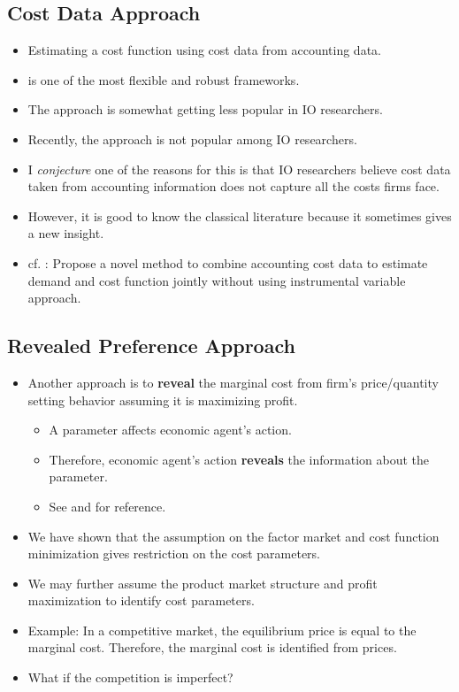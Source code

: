 \documentclass[]{book}
\providecommand{\tightlist}{%
  \setlength{\itemsep}{0pt}\setlength{\parskip}{0pt}}
\theoremstyle{definition}
\theoremstyle{definition}
\theoremstyle{definition}
\theoremstyle{remark}
\begin{document}
\subsection{Cost Data Approach}\label{cost-data-approach}

\begin{itemize}
\tightlist
\item
  Estimating a cost function using cost data from accounting data.
\item
  \citet{McElroy1987} is one of the most flexible and robust frameworks.
\item
  The approach is somewhat getting less popular in IO researchers.
\item
  Recently, the approach is not popular among IO researchers.
\item
  I \textit{conjecture} one of the reasons for this is that IO
  researchers believe cost data taken from accounting information does
  not capture all the costs firms face.
\item
  However, it is good to know the classical literature because it
  sometimes gives a new insight.
\item
  cf. \citet{Byrne2015} : Propose a novel method to combine accounting
  cost data to estimate demand and cost function jointly without using
  instrumental variable approach.
\end{itemize}

\subsection{Revealed Preference
Approach}\label{revealed-preference-approach}

\begin{itemize}
\tightlist
\item
  Another approach is to \textbf{reveal} the marginal cost from firm's
  price/quantity setting behavior assuming it is maximizing profit.

  \begin{itemize}
  \tightlist
  \item
    A parameter affects economic agent's action.
  \item
    Therefore, economic agent's action \textbf{reveals} the information
    about the parameter.
  \item
    See \citet{Bresnahan1981} and \citet{Bresnahan1989} for reference.
  \end{itemize}
\item
  We have shown that the assumption on the factor market and cost
  function minimization gives restriction on the cost parameters.
\item
  We may further assume the product market structure and profit
  maximization to identify cost parameters.
\item
  Example: In a competitive market, the equilibrium price is equal to
  the marginal cost. Therefore, the marginal cost is identified from
  prices.
\item
  What if the competition is imperfect?
\end{itemize}
\end{document}
